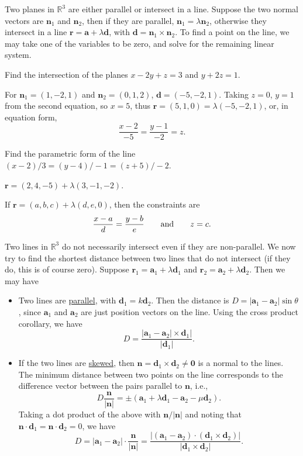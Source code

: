\documentclass[10pt,notitlepage]{revtex4-1}
\newenvironment{example}[1][Example]{\begin{trivlist}
\item[\hskip \labelsep {\bfseries #1}]}{\end{trivlist}}
\newcommand{\ab}{{\boldsymbol{a}}}
\newcommand{\db}{{\boldsymbol{d}}}
\newcommand{\nb}{{\boldsymbol{n}}}
\begin{document}
Two planes in $\mathbb{R}^3$ are either parallel or intersect in a line. Suppose
the two normal vectors are $\nb_1$ and $\nb_2$, then if they are parallel,
$\nb_1=\lambda \nb_2$, otherwise they intersect in a line
$\boldsymbol{r}=\ab+\lambda\db$, with $\db=\nb_1\times\nb_2$. To find a point on
the line, we may take one of the variables to be zero, and solve for the
remaining linear system.
\begin{example}
	Find the intersection of the planes $x-2y+z=3$ and $y+2z=1$.
	
	For $\nb_1=(1,-2,1)$ and $\nb_2=(0,1,2)$, $\db=(-5,-2,1)$. Taking $z=0$,
	$y=1$ from the second equation, so $x=5$, thus
	$\boldsymbol{r}=(5,1,0)=\lambda(-5,-2,1)$, or, in equation form,
	\begin{equation}
		\frac{x-2}{-5}=\frac{y-1}{-2}=z.
	\end{equation}
\end{example}
\begin{example}
	Find the parametric form of the line $(x-2)/3=(y-4)/-1=(z+5)/-2$.
	
	$\boldsymbol{r}=(2,4,-5)+\lambda(3,-1,-2)$.
\end{example}

If $\boldsymbol{r}=(a,b,c)+\lambda(d,e,0)$, then the constraints are
\begin{equation}
	\frac{x-a}{d}=\frac{y-b}{e}\qquad\textnormal{and}\qquad z=c.
\end{equation}

Two lines in $\mathbb{R}^3$ do not necessarily intersect even if they are
non-parallel. We now try to find the shortest distance between two lines that do
not intersect (if they do, this is of course zero). Suppose
$\boldsymbol{r}_1=\ab_1+\lambda\db_1$ and $\boldsymbol{r}_2=\ab_2+\lambda\db_2$.
Then we may have
\begin{itemize}
	\item Two lines are \underline{parallel}, with $\db_1=k\db_2$. Then the
	distance is $D=|\ab_1-\ab_2|\sin\theta$, since $\ab_1$ and $\ab_2$ are just
	position vectors on the line. Using the cross product corollary, we have
	\begin{equation}
		D=\frac{|\ab_1-\ab_2|\times\db_1|}{|\db_1|}.
	\end{equation}
	\item If the two lines are \underline{skewed}, then
	$\nb=\db_1\times\db_2\neq\boldsymbol{0}$ is a normal to the lines. The
	minimum distance between two points on the line corresponds to the
	difference vector between the pairs parallel to $\nb$, i.e.,
	\begin{equation}
		D\frac{\nb}{|\nb|}=\pm(\ab_1+\lambda\db_1-\ab_2-\mu\db_2).
	\end{equation}
	Taking a dot product of the above with $\nb/|\nb|$ and noting that
	$\nb\cdot\db_1=\nb\cdot\db_2=0$, we have
	\begin{equation}
		D=|\ab_1-\ab_2|\cdot\frac{\nb}{|\nb|}=
		\frac{|(\ab_1-\ab_2)\cdot(\db_1\times\db_2)|}{|\db_1 \times \db_2|}.
	\end{equation}
\end{itemize}
\end{document}
